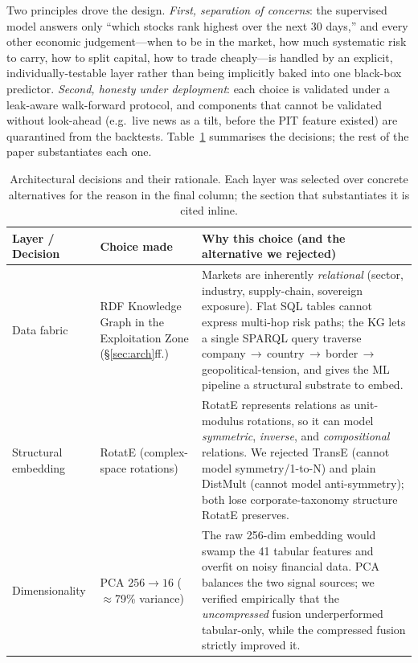 \documentclass[10pt,journal,compsoc]{IEEEtran}
\begin{document}
Two principles drove the design. \emph{First, separation of concerns}: the supervised model answers only ``which stocks rank highest over the next 30 days,'' and every other economic judgement---when to be in the market, how much systematic risk to carry, how to split capital, how to trade cheaply---is handled by an explicit, individually-testable layer rather than being implicitly baked into one black-box predictor. \emph{Second, honesty under deployment}: each choice is validated under a leak-aware walk-forward protocol, and components that cannot be validated without look-ahead (e.g.\ live news as a tilt, before the PIT feature existed) are quarantined from the backtests. Table~\ref{tab:design} summarises the decisions; the rest of the paper substantiates each one.

\begin{table}[tbp]
\centering
\caption{Architectural decisions and their rationale. Each layer was selected over concrete alternatives for the reason in the final column; the section that substantiates it is cited inline.}
\label{tab:design}
\small
\renewcommand{\arraystretch}{1.25}
\begin{tabular}{@{}p{2.5cm}p{3.4cm}p{10.3cm}@{}}
\toprule
\textbf{Layer / Decision} & \textbf{Choice made} & \textbf{Why this choice (and the alternative we rejected)} \\
\midrule
Data fabric & RDF Knowledge Graph in the Exploitation Zone (\S\ref{sec:arch}ff.) & Markets are inherently \emph{relational} (sector, industry, supply-chain, sovereign exposure). Flat SQL tables cannot express multi-hop risk paths; the KG lets a single SPARQL query traverse company\,$\to$\,country\,$\to$\,border\,$\to$\,geopolitical-tension, and gives the ML pipeline a structural substrate to embed. \\
Structural embedding & RotatE (complex-space rotations) & RotatE represents relations as unit-modulus rotations, so it can model \emph{symmetric}, \emph{inverse}, and \emph{compositional} relations. We rejected TransE (cannot model symmetry/1-to-N) and plain DistMult (cannot model anti-symmetry); both lose corporate-taxonomy structure RotatE preserves. \\
Dimensionality & PCA $256\!\to\!16$ ($\approx$79\% variance) & The raw 256-dim embedding would swamp the 41 tabular features and overfit on noisy financial data. PCA balances the two signal sources; we verified empirically that the \emph{uncompressed} fusion underperformed tabular-only, while the compressed fusion strictly improved it. \\

\end{tabular}
\end{table}
\end{document}
